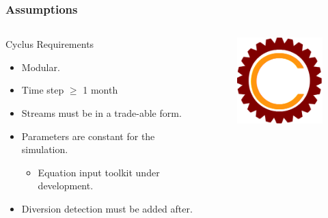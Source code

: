 \begin{frame}
\frametitle{Assumptions}
\begin{columns}
	\begin{column}{.45\textwidth}
		\begin{block}{Cyclus Requirements} 
			\begin{itemize}
				\item Modular.
				\item Time step $\geq$ 1 month
				\item Streams must be in a
				trade-able form.
				\item Parameters are constant for the simulation.
				\begin{itemize}
					\item Equation input toolkit under development.
				\end{itemize}
				\item Diversion detection must be added after.
			\end{itemize}
		\end{block}
	\end{column}
	\begin{column}{.55\textwidth}
		\begin{figure}
			\centering
			\includegraphics[width=0.9\linewidth]{cyclus}
			\label{fig:cyclus}
		\end{figure}
	\end{column}
\end{columns} 
\end{frame}

